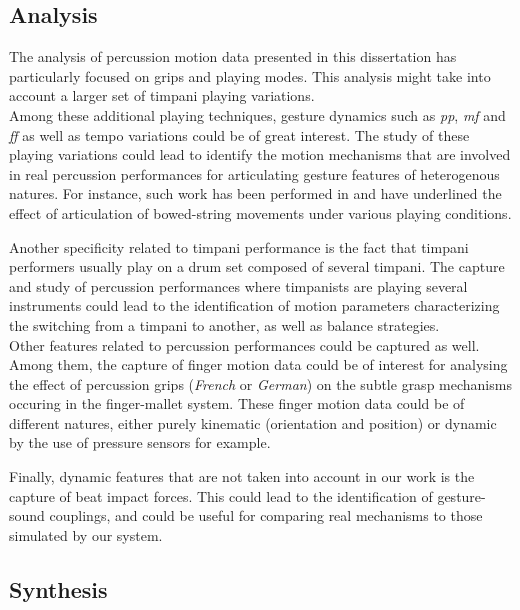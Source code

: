 		\subsection{Analysis}
		\label{subsec:Conclusion_FutureWork_Analysis}

The analysis of percussion motion data presented in this dissertation has particularly focused on grips and playing modes. This analysis might take into account a larger set of timpani playing variations.\\

Among these additional playing techniques, gesture dynamics such as \emph{pp}, \emph{mf} and \emph{ff} as well as tempo variations could be of great interest. The study of these playing variations could lead to identify the motion mechanisms that are involved in real percussion performances for articulating gesture features of heterogenous natures. For instance, such work has been performed in  and have underlined the effect of articulation of bowed-string movements under various playing conditions. 

Another specificity related to timpani performance is the fact that timpani performers usually play on a drum set composed of several timpani. The capture and study of percussion performances where timpanists are playing several instruments could lead to the identification of motion parameters characterizing the switching from a timpani to another, as well as balance strategies.\\

Other features related to percussion performances could be captured as well. Among them, the capture of finger motion data could be of interest for analysing the effect of percussion grips (\emph{French} or \emph{German}) on the subtle grasp mechanisms occuring in the finger-mallet system. These finger motion data could be of different natures, either purely kinematic (orientation and position) or dynamic by the use of pressure sensors for example.

Finally, dynamic features that are not taken into account in our work is the capture of beat impact forces. This could lead to the identification of gesture-sound couplings, and could be useful for comparing real mechanisms to those simulated by our system.


		\subsection{Synthesis}
		\label{subsec:Conclusion_FutureWork_Synthesis}

